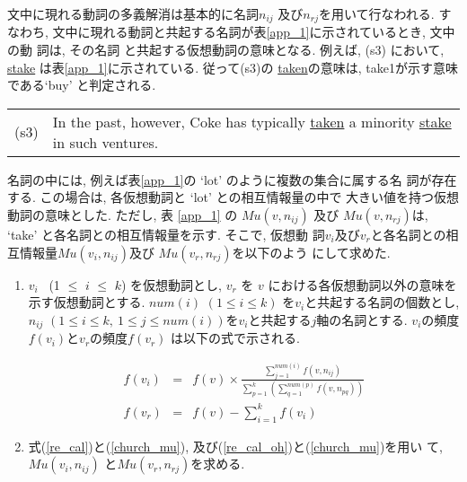 文中に現れる動詞の多義解消は基本的に名詞$n_{ij}$ 及び$n_{rj}$を用いて行なわれる. 
すなわち, 文中に現れる動詞と共起する名詞が表\ref{app_1}に示されているとき, 文中の動
詞は, その名詞
と共起する仮想動詞の意味となる.  例えば, (s3) において,
\underline{stake} は表\ref{app_1}に示されている.  従って(s3)の
\underline{taken}の意味は, {\sf take1}が示す意味である`buy' と判定される.

\vspace*{2mm}
\begin{tabular}{ll}
(s3) &\parbox[t]{12cm}{In the past, however, Coke has typically
\underline{taken} a minority \underline{stake} in such ventures.} \\
\end{tabular}
\vspace*{2mm}

\noindent 
名詞の中には, 例えば表\ref{app_1}の `lot' のように複数の集合に属する名
詞が存在する. この場合は, 各仮想動詞と `lot' との相互情報量の中で
大きい値を持つ仮想動詞の意味とした.  ただし, 表 \ref{app_1} の $Mu(v,
n_{ij})$ 及び $Mu(v,n_{rj})$は, `take' と各名詞との相互情報量を示す.  そこで, 仮想動
詞$v_{i}$及び$v_{r}$と各名詞との相互情報量$Mu(v_{i},n_{ij})$及び
$Mu(v_{r},n_{rj})$を以下のよう
にして求めた.

\begin{enumerate}
\item $v_{i}$ \ (1 $\leq$ $i$ $\leq$ $k$) を仮想動詞とし, $v_{r}$ を 
$v$ における各仮想動詞以外の意味を示す仮想動詞とする.  $num(i)$ $(1
\leq i \leq k)$ を$v_{i}$と共起する名詞の個数とし, $n_{ij}$ $(1 \leq i
\leq k, \ 1 \leq j
\leq num(i))$を$v_{i}$\hspace{-0.1mm}と共起する$j$軸の名詞とする.
\hspace{-0.1mm}$v_{i}$の頻度$f(v_{i})$と$v_{r}$の頻度$f(v_{r})$ は以下の式で示される.

\begin{eqnarray}
f(v_{i}) & = & f(v) \times
\frac{\sum_{j=1}^{num(i)}f(v,n_{ij})}{\sum_{p=1}^{k}(\sum_{q=1}^{num(p)}f(v,n_{pq}))}
\label{re_cal} \\
f(v_{r}) & = & f(v) - \sum_{i=1}^{k}f(v_{i}) \label{re_cal_oh}
\end{eqnarray}

\item 式(\ref{re_cal})と(\ref{church_mu}), 及び(\ref{re_cal_oh})と(\ref{church_mu})を用い
て, $Mu(v_{i},n_{ij})$ と$Mu(v_{r},n_{rj})$を求める.

\end{enumerate}


